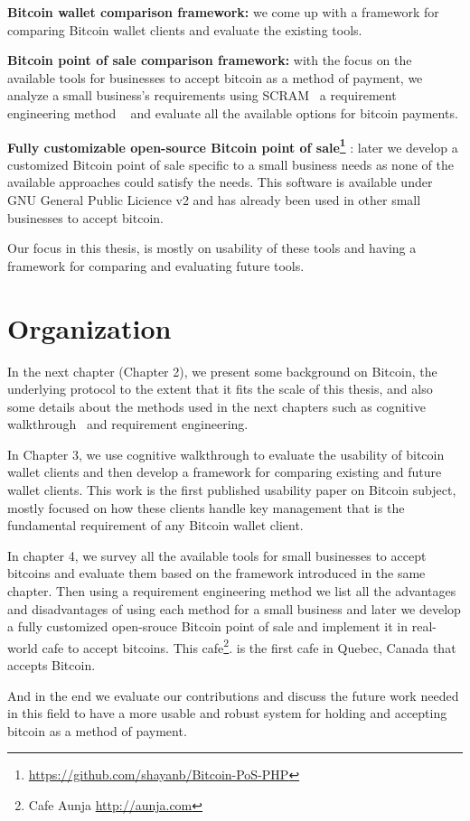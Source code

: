 \textbf{Bitcoin wallet comparison framework:} we come up with a framework for comparing Bitcoin wallet clients and evaluate the existing tools.

\textbf{Bitcoin point of sale comparison framework: } with the focus on the available tools for businesses to accept bitcoin as a method of payment, we analyze a small business's requirements using SCRAM~\cite{REScenario} a requirement engineering method ~\cite{dorfman1990system} and evaluate all the available options for bitcoin payments.

\textbf{Fully customizable open-source Bitcoin point of sale\footnote{\url{https://github.com/shayanb/Bitcoin-PoS-PHP}} }: later we develop a customized Bitcoin point of sale specific to a small business needs as none of the available approaches could satisfy the needs. This software is available under GNU General Public Licience v2 and has already been used in other small businesses to accept bitcoin.

Our focus in this thesis, is mostly on usability of these tools and having a framework for comparing and evaluating future tools.

\section{Organization}
In the next chapter (Chapter 2), we present some background on Bitcoin, the underlying protocol to the extent that it fits the scale of this thesis, and also some details about the methods used in the next chapters such as cognitive walkthrough~\cite{WRLP94}  and requirement engineering.

In Chapter 3, we use cognitive walkthrough to evaluate the usability of bitcoin wallet clients and then develop a framework for comparing existing and future wallet clients. This work is the first published usability paper on Bitcoin subject, mostly focused on how these clients handle key management that is the fundamental requirement of any Bitcoin wallet client.

In chapter 4, we survey all the available tools for small businesses to accept bitcoins and evaluate them based on the framework introduced in the same chapter. Then using a requirement engineering method we list all the advantages and disadvantages of using each method for a small business and later we develop a fully customized open-srouce Bitcoin point of sale and implement it in real-world cafe to accept bitcoins. This cafe\footnote{ Cafe Aunja \url{http://aunja.com}}. is the first cafe in Quebec, Canada that accepts Bitcoin.

And in the end we evaluate our contributions and discuss the future work needed in this field to have a more usable and robust system for holding and accepting bitcoin as a method of payment.